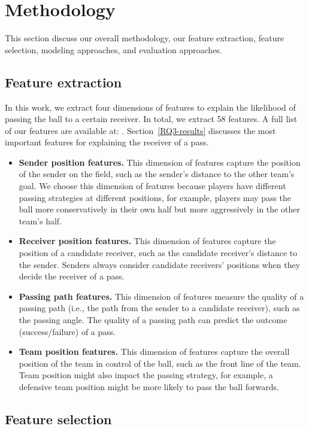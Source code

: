 \section{Methodology} \label{methodology}
This section discuss our overall methodology, our feature extraction, feature selection, modeling approaches, and evaluation approaches.

\subsection{Feature extraction}

In this work, we extract four dimensions of features to explain the likelihood of passing the ball to a certain receiver. In total, we extract 58 features. A full list of our features are available at: . Section~\ref{RQ3-results} discusses the most important features for explaining the receiver of a pass.
\begin{itemize}
	\item \textbf{Sender position features.} This dimension of features capture the position of the sender on the field, such as the sender's distance to the other team's goal. We choose this dimension of features because players have different passing strategies at different positions, for example, players may pass the ball more conservatively in their own half but more aggressively in the other team's half.
	\item \textbf{Receiver position features.} This dimension of features capture the position of a candidate receiver, such as the candidate receiver's distance to the sender. Senders always consider candidate receivers' positions when they decide the receiver of a pass.
	\item \textbf{Passing path features.} This dimension of features measure the quality of a passing path (i.e., the path from the sender to a candidate receiver), such as the passing angle. The quality of a passing path can predict the outcome (success/failure) of a pass.
	\item \textbf{Team position features.} This dimension of features capture the overall position of the team in control of the ball, such as the front line of the team. Team position might also impact the passing strategy, for example, a defensive team position might be more likely to pass the ball forwards.
\end{itemize}

\subsection{Feature selection}

